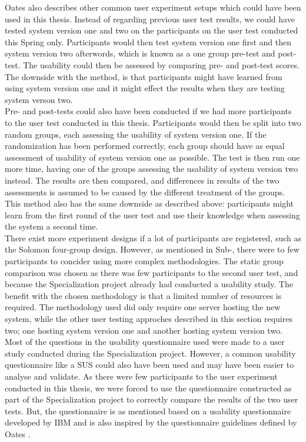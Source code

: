 Oates also describes other common user experiment setups which could have been used in this thesis. Instead of regarding previous user test results, we could have tested system version one and two on the participants on the user test conducted this Spring only. Participants would then test system version one first and then system version two afterwords, which is known as a one group pre-test and post-test. The usability could then be assessed by comparing pre- and post-test scores. The downside with the method, is that participants might have learned from using system version one and it might effect the results when they are testing system verson two. \\

Pre- and post-tests could also have been conducted if we had more participants to the user test conducted in this thesis. Participants would then be split into two random groups, each assessing the usability of system version one. If the randomization has been performed correctly, each group should have as equal assessment of usability of system version one as possible. The test is then run one more time, having one of the groups assessing the usability of system version two instead. The results are then compared, and differences in results of the two assessments is assumed to be caused by the different treatment of the groups. This method also has the same downside as described above: participants might learn from the first round of the user test and use their knowledge when assessing the system a second time. \\

There exist more experiment designs if a lot of participants are registered, such as the Solomon four-group design. However, as mentioned in Sub-, there were to few participants to concider using more complex methodologies. The static group comparison was chosen as there was few participants to the second user test, and because the Specialization project already had conducted a usability study. The benefit with the chosen methodology is that a limited number of resources is required. The methodology used did only require one server hosting the new system, while the other user testing approches described in this section requires two; one hosting system version one and another hosting system version two. \\

Most of the questions in the usability questionnaire used were made to a user study conducted during the Specialization project. However, a common usability questionnaire like a SUS \cite{brooke1996} could also have been used and may have been easier to analyse and validate. As there were few participants to the user experiment conducted in this thesis, we were forced to use the questionnaire constructed as part of the Specialization project to correctly compare the results of the two user tests. But, the questionnaire is as mentioned based on a usability questionnaire developed by IBM and is also inspired by the questionnaire guidelines defined by Oates \cite{Oates2006}. \\

